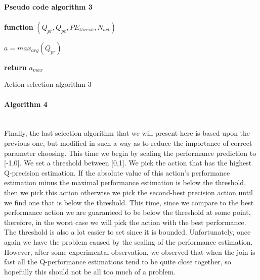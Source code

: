\paragraph{Pseudo code algorithm 3}
\begin{center}
	\begin{algorithm}[H]

    \textbf{function}  $(Q_{pr},Q_{pe},PE_{thresh},N_{act})$\;
    
    
    \Indp{}\Indm
    \Indp{} \Indm
    \Indp
   	$a=max_{arg}(Q_{pr})$\\
    
   
  
   \textbf{return} $a_{max}$
   
    
\caption{Action selection algorithm 3}
\end{algorithm}
\end{center}
\paragraph{Algorithm 4}\mbox{}\\
Finally, the last selection algorithm that we will present here is based upon the previous one, but modified in such a way as to reduce the importance of correct parameter choosing. This time we begin by scaling the performance prediction to [-1,0]. We set a threshold between [0,1]. We pick the action that has the highest Q-precision estimation. If the absolute value of this action's performance estimation minus the maximal performance estimation is below the threshold, then we pick this action otherwise we pick the second-best precision action until we find one that is below the threshold. This time, since we compare to the best performance action we are guaranteed to be below the threshold at some point, therefore, in the worst case we will pick the action with the best performance. The threshold is also a lot easier to set since it is bounded. Unfortunately, once again we have the problem caused by the scaling of the performance estimation. However, after some experimental observation, we observed that when the join is fast all the Q-performance estimations tend to be quite close together, so hopefully this should not be all too much of a problem.

